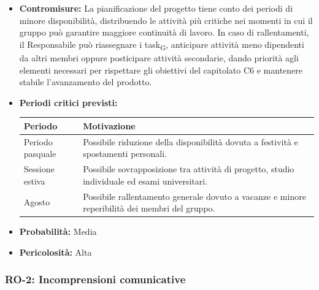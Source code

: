 \documentclass[a4paper, 10pt, colorlinks=true, linkcolor=black, urlcolor=blue, citecolor=blue, hidelinks]{article}
\renewcommand{\arraystretch}{1.2}
\begin{document}
\begin{itemize}
    \item \textbf{Contromisure:} La pianificazione del progetto tiene conto dei periodi di minore disponibilità, distribuendo le attività più critiche nei momenti in cui il gruppo può garantire maggiore continuità di lavoro. In caso di rallentamenti, il Responsabile può riassegnare i task\textsubscript{G}, anticipare attività meno dipendenti da altri membri oppure posticipare attività secondarie, dando priorità agli elementi necessari per rispettare gli obiettivi del capitolato C6 e mantenere stabile l'avanzamento del prodotto.
    \item \textbf{Periodi critici previsti:}
    \begin{center}
        \renewcommand{\arraystretch}{1.3}
        \begin{tabularx}{0.9\textwidth}{|l|X|}
            \hline
            \textbf{Periodo} & \textbf{Motivazione} \\
            \hline
            Periodo pasquale & Possibile riduzione della disponibilità dovuta a festività e spostamenti personali. \\
            \hline
            Sessione estiva & Possibile sovrapposizione tra attività di progetto, studio individuale ed esami universitari. \\
            \hline
            Agosto & Possibile rallentamento generale dovuto a vacanze e minore reperibilità dei membri del gruppo. \\
            \hline
        \end{tabularx}
    \end{center}

    \item \textbf{Probabilità:} Media

    \item \textbf{Pericolosità:} Alta
\end{itemize}

\subsubsection{RO-2: Incomprensioni comunicative}
\end{document}
